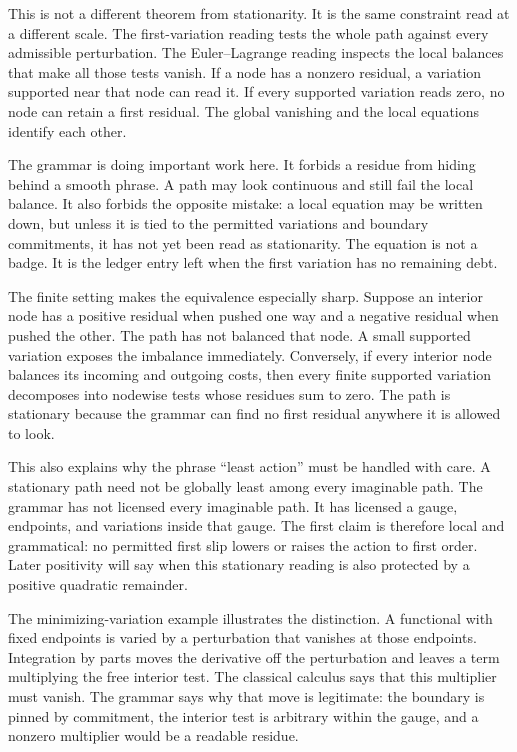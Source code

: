 This is not a different theorem from stationarity. It is the same constraint
read at a different scale. The first-variation reading tests the whole path
against every admissible perturbation. The Euler--Lagrange reading inspects
the local balances that make all those tests vanish. If a node has a
nonzero residual, a variation supported near that node can read it. If every
supported variation reads zero, no node can retain a first residual. The
global vanishing and the local equations identify each other.

The grammar is doing important work here. It forbids a residue from hiding
behind a smooth phrase. A path may look continuous and still fail the local
balance. It also forbids the opposite mistake: a local equation may be
written down, but unless it is tied to the permitted variations and boundary
commitments, it has not yet been read as stationarity. The equation is not a
badge. It is the ledger entry left when the first variation has no remaining
debt.

The finite setting makes the equivalence especially sharp. Suppose an
interior node has a positive residual when pushed one way and a negative
residual when pushed the other. The path has not balanced that node. A
small supported variation exposes the imbalance immediately. Conversely, if
every interior node balances its incoming and outgoing costs, then every
finite supported variation decomposes into nodewise tests whose residues
sum to zero. The path is stationary because the grammar can find no first
residual anywhere it is allowed to look.

This also explains why the phrase ``least action'' must be handled with
care. A stationary path need not be globally least among every imaginable
path. The grammar has not licensed every imaginable path. It has licensed a
gauge, endpoints, and variations inside that gauge. The first claim is
therefore local and grammatical: no permitted first slip lowers or raises
the action to first order. Later positivity will say when this stationary
reading is also protected by a positive quadratic remainder.

The minimizing-variation example illustrates the distinction. A functional
with fixed endpoints is varied by a perturbation that vanishes at those
endpoints. Integration by parts moves the derivative off the perturbation
and leaves a term multiplying the free interior test. The classical
calculus says that this multiplier must vanish. The grammar says why that
move is legitimate: the boundary is pinned by commitment, the interior test
is arbitrary within the gauge, and a nonzero multiplier would be a readable
residue.

